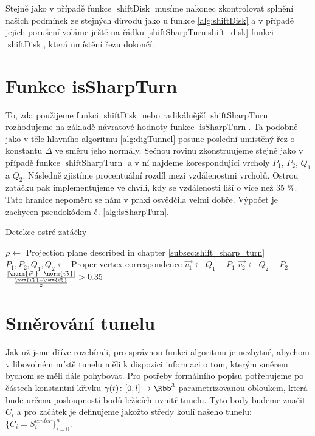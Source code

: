 Stejně jako v případě funkce $ \operatorname{shiftDisk} $ musíme nakonec
zkontrolovat splnění našich podmínek ze stejných důvodů jako u funkce
\ref{alg:shiftDisk} a v případě jejich porušení voláme ještě
na řádku \ref{shiftSharpTurn:shift_disk} funkci $ \operatorname{shiftDisk} $,
která umístění řezu dokončí.





\section{Funkce isSharpTurn} \label{subsec:is_sharp_turn}
To, zda použijeme funkci $ \operatorname{shiftDisk} $ nebo radikálnější
$ \operatorname{shiftSharpTurn} $ rozhodujeme na základě návratové hodnoty
funkce $ \operatorname{isSharpTurn} $. Ta podobně jako v těle hlavního
algoritmu \ref{alg:digTunnel} posune poslední umístěný řez o konstantu
$ \Delta $ ve směru jeho normály. Sečnou rovinu zkonstruujeme stejně jako v
případě funkce $ \operatorname{shiftSharpTurn} $ a v ní najdeme korespondující
vrcholy $ P_1$, $P_2$, $Q_1$ a $ Q_2 $. Následně zjistíme procentuální rozdíl
mezi vzdálenostmi vrcholů. Ostrou zatáčku pak implementujeme ve chvíli, kdy se
vzdálenosti liší o více než 35 \%. Tato hranice nepoměru se nám v praxi osvědčila
velmi dobře. Výpočet je zachycen pseudokódem č. \ref{alg:isSharpTurn}.

\begin{algorithm}
\caption{Detekce ostré zatáčky}
\label{alg:isSharpTurn}
\begin{algorithmic}[1]

    \State $ \rho \gets $ Projection plane described in chapter \ref{subsec:shift_sharp_turn}
    \State $ P_1, P_2, Q_1, Q_2 \gets $ Proper vertex correspondence
    \State $ \vec{v_1} \gets Q_1 - P_1 $
    \State $ \vec{v_2} \gets Q_2 - P_2 $
    \State \Return $ \frac{\left| \norm{\vec{v_1}} - \norm{\vec{v_2}} \right|}
                          {\frac{\norm{\vec{v_1}} + \norm{\vec{v_2}}}{2}} > 0.35$
\EndFunction

\end{algorithmic}
\end{algorithm}





\section{Směrování tunelu} \label{subsec:tunnel_dir}
Jak už jsme dříve rozebírali, pro správnou funkci algoritmu je nezbytné, abychom
v libovolném místě tunelu měli k dispozici informaci o tom, kterým směrem bychom
se měli dále pohybovat. Pro potřeby formálního popisu potřebujeme
po částech konstantní křivku $ \gamma(t) \colon [0, l] \to \Rbb^3$
parametrizovanou obloukem, která bude
určena posloupností bodů ležících uvnitř tunelu. Tyto body budeme značit
$ C_i $ a pro začátek je definujeme jakožto středy koulí našeho tunelu:
$ \{C_i = S_i^{center}\}_{i=0}^{n} $.

